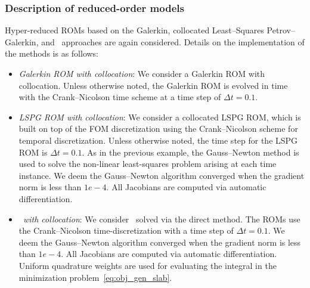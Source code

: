 \subsubsection{Description of reduced-order models}
Hyper-reduced ROMs based on the Galerkin, collocated Least--Squares Petrov--Galerkin, and \methodAcronym\ approaches are 
again considered. Details on the implementation of the methods is as follows:
\begin{itemize}
\item \textit{Galerkin ROM with collocation}: We consider a Galerkin ROM with collocation. Unless 
otherwise noted, the Galerkin ROM is evolved in time with the Crank--Nicolson time scheme at a time step of $\Delta t =0.1$.

\item \textit{LSPG ROM with collocation}: We consider a collocated LSPG ROM, which is built on top of the FOM discretization using the Crank--Nicolson scheme for temporal 
discretization. Unless otherwise noted, the time step for the LSPG ROM is $\Delta t  = 0.1$. As in the previous example, 
the Gauss--Newton method is used to solve the non-linear least-squares problem arising at each time instance. We deem the Gauss--Newton 
algorithm converged when the gradient norm is less than $1e-4$. All Jacobians are computed via automatic differentiation.
 
\item \textit{\methodAcronymROMs\ with collocation}: We consider \methodAcronymROMs\ solved via the direct method. The ROMs use the Crank--Nicolson time-discretization with a time step of 
$\Delta t = 0.1$. We deem the Gauss--Newton algorithm converged when the gradient norm is less than $1e-4$. All Jacobians are computed via automatic differentiation. Uniform quadrature 
weights are used for evaluating the integral in the minimization problem~\eqref{eq:obj_gen_slab}. 
 
\end{itemize}


